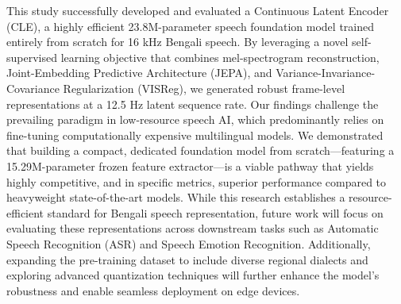 This study successfully developed and evaluated a Continuous Latent Encoder (CLE), a highly efficient 23.8M-parameter speech foundation model trained entirely from scratch for 16 kHz Bengali speech. By leveraging a novel self-supervised learning objective that combines mel-spectrogram reconstruction, Joint-Embedding Predictive Architecture (JEPA), and Variance-Invariance-Covariance Regularization (VISReg), we generated robust frame-level representations at a 12.5 Hz latent sequence rate. Our findings challenge the prevailing paradigm in low-resource speech AI, which predominantly relies on fine-tuning computationally expensive multilingual models. We demonstrated that building a compact, dedicated foundation model from scratch—featuring a 15.29M-parameter frozen feature extractor—is a viable pathway that yields highly competitive, and in specific metrics, superior performance compared to heavyweight state-of-the-art models. While this research establishes a resource-efficient standard for Bengali speech representation, future work will focus on evaluating these representations across downstream tasks such as Automatic Speech Recognition (ASR) and Speech Emotion Recognition. Additionally, expanding the pre-training dataset to include diverse regional dialects and exploring advanced quantization techniques will further enhance the model's robustness and enable seamless deployment on edge devices.